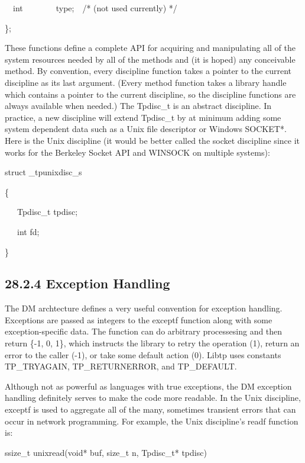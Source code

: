 {\ttfamily\mdseries
\ \ int\ \ \ \ \ \ \ \ type;\ \ /* (not used currently) */}

{\ttfamily\mdseries
\};}


\bigskip


These functions define a complete API for acquiring and manipulating
all of the system resources needed by all of the methods and (it is
hoped) any conceivable method. By convention, every discipline
function takes a pointer to the current discipline as its last
argument. (Every method function takes a library handle which contains
a pointer to the current discipline, so the discipline functions are
always available when needed.) The Tpdisc\_t is an abstract
discipline. In practice, a new discipline will extend Tpdisc\_t by at
minimum adding some system dependent data such as a Unix file
descriptor or Windows SOCKET*. Here is the
{\textquotedbl}Unix{\textquotedbl} discipline (it would be better
called the socket discipline since it works for the Berkeley Socket
API and WINSOCK on multiple systems):

{\ttfamily\mdseries
struct \_tpunixdisc\_s}

{\ttfamily\mdseries
\{}

{\ttfamily\mdseries
\ \ \ Tpdisc\_t tpdisc;}

{\ttfamily\mdseries
\ \ \ int fd;}

{\ttfamily\mdseries
\}}

\subsection[28.2.4 Exception Handling]{28.2.4 Exception Handling}

The DM archtecture defines a very useful convention for exception
handling. Exceptions are passed as integers to the exceptf function
along with some exception-specific data. The function can do arbitrary
processesing and then return \{-1, 0, 1\}, which instructs the library
to retry the operation (1), return an error to the caller (-1), or
take some default action (0). Libtp uses constants TP\_TRYAGAIN,
TP\_RETURNERROR, and TP\_DEFAULT.

Although not as powerful as languages with true exceptions, the DM
exception handling definitely serves to make the code more
readable. In the Unix discipline, exceptf is used to aggregate all of
the many, sometimes transient errors that can occur in network
programming. For example, the Unix discipline's readf function is:

{\ttfamily\mdseries
ssize\_t unixread(void* buf, size\_t n, Tpdisc\_t* tpdisc)}

